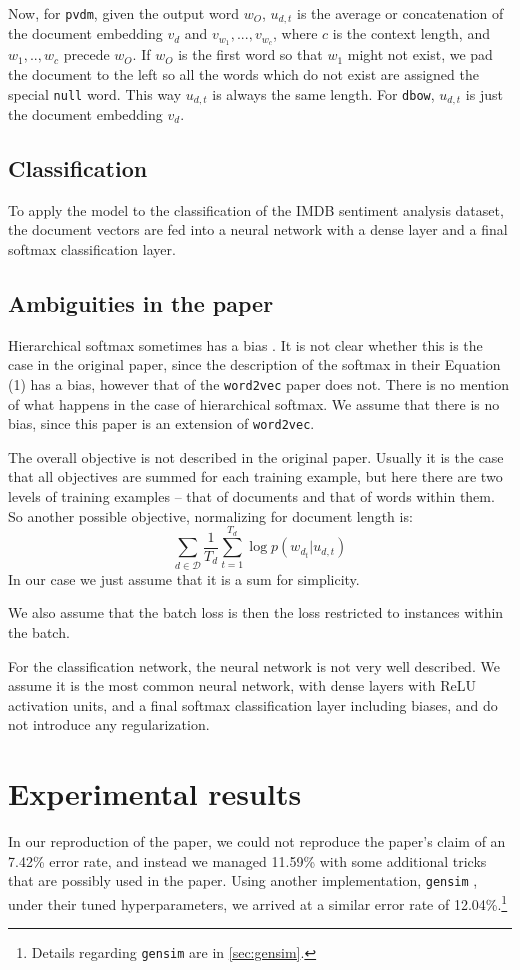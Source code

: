 \documentclass{article}
\begin{document}
Now, for \texttt{pvdm}, given the output word $w_O$, $u_{d,t}$ is the average or concatenation of the document embedding $v_d$ and $v_{w_1},...,v_{w_c}$, where $c$ is the context length, and $w_1,..,w_c$ precede $w_O$. If $w_O$ is the first word so that $w_1$ might not exist, we pad the document to the left so all the words which do not exist are assigned the special \texttt{null} word. This way $u_{d,t}$ is always the same length. For \texttt{dbow}, $u_{d,t}$ is just the document embedding $v_d$.

\subsection{Classification}
To apply the model to the classification of the IMDB sentiment analysis dataset, the document vectors are fed into a neural network with a dense layer and a final softmax classification layer.

\subsection{Ambiguities in the paper}
Hierarchical softmax sometimes has a bias \citep{mnih_scalable_2009}. It is not clear whether this is the case in the original paper, since the description of the softmax in their Equation (1) has a bias, however that of the \texttt{word2vec} paper does not. There is no mention of what happens in the case of hierarchical softmax. We assume that there is no bias, since this paper is an extension of \texttt{word2vec}.

The overall objective is not described in the original paper. Usually it is the case that all objectives are summed for each training example, but here there are two levels of training examples -- that of documents and that of words within them. So another possible objective, normalizing for document length is:
    \[\sum_{d\in\mathcal{D}}\frac{1}{T_d}\sum_{t=1}^{T_d} \log p(w_{d_t}|u_{d,t})\]
In our case we just assume that it is a sum for simplicity.

We also assume that the batch loss is then the loss restricted to instances within the batch.

For the classification network, the neural network is not very well described. We assume it is the most common neural network, with dense layers with ReLU activation units, and a final softmax classification layer including biases, and do not introduce any regularization.

\section{Experimental results}
In our reproduction of the paper, we could not reproduce the paper's claim of an 7.42\% error rate, and instead we managed 11.59\% with some additional tricks that are possibly used in the paper. Using another implementation, \texttt{gensim} \citep{rehurek_software_2010}, under their tuned hyperparameters, we arrived at a similar error rate of 12.04\%.\footnote{Details regarding \texttt{gensim} are in \autoref{sec:gensim}.}
\end{document}
